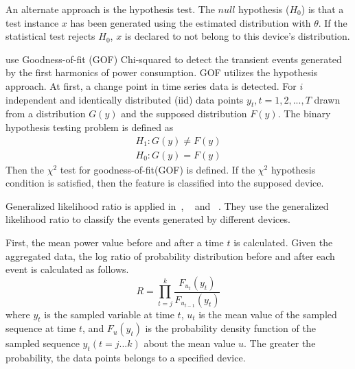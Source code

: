 An alternate approach is the hypothesis test.
The $null$ hypothesis ($H_0$) is that a test instance $x$ has been generated 
using the estimated distribution with $\theta$. 
If the statistical test rejects $H_0$, 
$x$ is declared to not belong to this device's distribution. 

\cite{jin2011robust,jin2011time} use Goodness-of-fit (GOF) Chi-squared
to detect the transient events generated by
the first harmonics of power consumption.
GOF utilizes the hypothesis approach.
At first, a change point in time series data is detected.
For $i$ independent and identically distributed (iid) data points $y_t,t=1,2,...,T$
drawn from a distribution $G(y)$ and the supposed distribution $F(y)$.
The binary hypothesis testing problem is defined as
\begin{eqnarray}
H_1: G(y) \ne F(y) \\
H_0: G(y) = F(y)
\end{eqnarray}
Then the $\chi^2$ test for goodness-of-fit(GOF) is defined. 
If the $\chi^2$ hypothesis condition is satisfied, 
then the feature is classified into the supposed device. 


Generalized likelihood ratio is applied in~\cite{anderson2012event}, ~\cite{berges2011user} and ~\cite{luo2002monitoring}. 
They use the generalized likelihood ratio to classify
the events generated by different devices.

First, the mean power value before and after a time $t$ is calculated. 
Given the aggregated data,  
the log ratio of probability distribution before and after each event 
is calculated as follows. 
\begin{equation}
R= \prod_{t=j}^{k}\frac{F_{u_t}(y_t)}{F_{u_{t-1}}(y_t)}
\end{equation}
where $y_t$ is the sampled variable at time $t$, 
$u_t$ is the mean value of the sampled sequence at time $t$, 
and $F_{u}(y_t)$ is the probability density function of the sampled sequence 
$y_t(t=j...k)$ about the mean value $u$. 
The greater the probability, the data points belongs 
to a specified device. 

